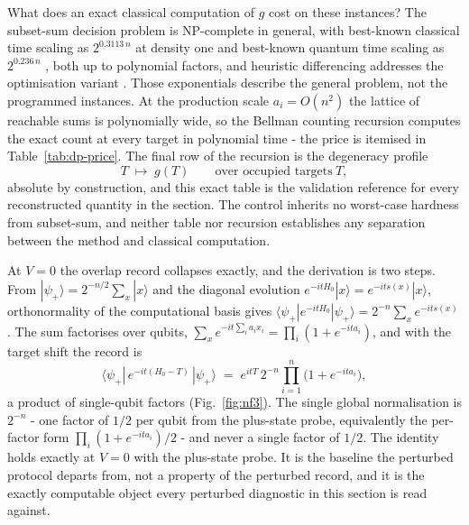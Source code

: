 What does an exact classical computation of $g$ cost on these instances? The subset-sum decision problem is NP-complete in general, with best-known classical time scaling as $2^{0.3113\, n}$ at density one \cite{hgj2010} and best-known quantum time scaling as $2^{0.236\, n}$ \cite{bonnetain2020improved}, both up to polynomial factors, and heuristic differencing addresses the optimisation variant \cite{karmarkar1982differencing}. Those exponentials describe the general problem, not the programmed instances. At the production scale $a_i = O(n^2)$ the lattice of reachable sums is polynomially wide, so the Bellman counting recursion \cite{bellman1957dp} computes the exact count at every target in polynomial time - the price is itemised in Table~\ref{tab:dp-price}. The final row of the recursion is the degeneracy profile
\begin{equation}\label{def:degeneracy-profile}
T \;\longmapsto\; g(T) \qquad \text{over occupied targets}\ T,
\end{equation}
absolute by construction, and this exact table is the validation reference for every reconstructed quantity in the section. The control inherits no worst-case hardness from subset-sum, and neither table nor recursion establishes any separation between the method and classical computation.

At $V = 0$ the overlap record collapses exactly, and the derivation is two steps. From $|\psi_+\rangle = 2^{-n/2} \sum_x |x\rangle$ and the diagonal evolution $e^{-i t H_0} |x\rangle = e^{-i t s(x)} |x\rangle$, orthonormality of the computational basis gives $\langle\psi_+| e^{-i t H_0} |\psi_+\rangle = 2^{-n} \sum_x e^{-i t s(x)}$. The sum factorises over qubits, $\sum_x e^{-i t \sum_i a_i x_i} = \prod_i (1 + e^{-i t a_i})$, and with the target shift the record is
\begin{equation}\label{thm:hardy-littlewood-collapse}
\langle\psi_+|\, e^{-i t (H_0 - T)}\, |\psi_+\rangle \;=\; e^{i t T}\, 2^{-n} \prod_{i=1}^{n} \bigl(1 + e^{-i t a_i}\bigr),
\end{equation}
a product of single-qubit factors (Fig.~\ref{fig:nf3}). The single global normalisation is $2^{-n}$ - one factor of $1/2$ per qubit from the plus-state probe, equivalently the per-factor form $\prod_i (1 + e^{-i t a_i})/2$ - and never a single factor of $1/2$. The identity holds exactly at $V = 0$ with the plus-state probe. It is the baseline the perturbed protocol departs from, not a property of the perturbed record, and it is the exactly computable object every perturbed diagnostic in this section is read against.

